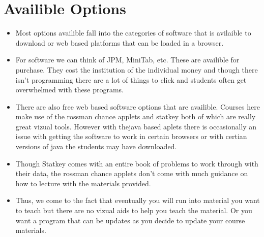 \documentclass[11pt]{article}
\begin{document}
\section{Availible Options}
\begin{itemize}
\item Most options availible fall into the categories of software that is avilaible to download or web based platforms that can be loaded in a browser. 
\item For software we can think of JPM, MiniTab, etc. These are availible for purchase. They cost the institution of the individual money and though there isn't programming there are a lot of things to click and students often get overwhelmed with these programs. 
\item There are also free web based software options that are availible. Courses here make use of the rossman chance applets and statkey both of which are really great vizual tools. However with thejava based aplets there is occasionally an issue with getting the software to work in certain browsers or with certian versions of java the students may have downloaded.
\item Though Statkey comes with an entire book of problems to work through with their data, the rossman chance applets don't come with much guidance on how to lecture with the materials provided. 
\item Thus, we come to the fact that eventually you will run into material you want to teach but there are no vizual aids to help you teach the material. Or you want a program that can be updates as you decide to update your course materials.
\end{itemize}
\end{document}
